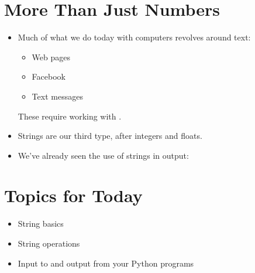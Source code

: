 \documentclass[letterpaper,10pt,english]{sphinxmanual}
\begin{document}
\section{More Than Just Numbers}
\label{\detokenize{lecture_notes/lec03_strings:more-than-just-numbers}}\begin{itemize}
\item {} 
Much of what we do today with computers revolves around text:
\begin{itemize}
\item {} 
Web pages

\item {} 
Facebook

\item {} 
Text messages

\end{itemize}

These require working with .

\item {} 
Strings are our third type, after integers and floats.

\item {} 
We’ve already seen the use of strings in output:

\begin{sphinxVerbatim}[commandchars=\\\{\}]
  
  
   
\end{sphinxVerbatim}

\end{itemize}


\section{Topics for Today}
\label{\detokenize{lecture_notes/lec03_strings:topics-for-today}}\begin{itemize}
\item {} 
String basics

\item {} 
String operations

\item {} 
Input to and output from your Python programs

\end{itemize}
\end{document}
